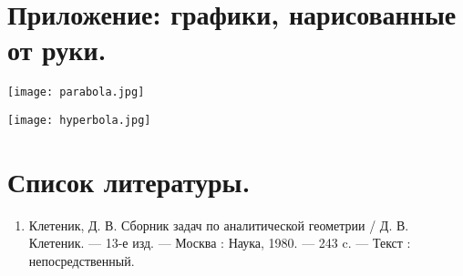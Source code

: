 \documentclass{article}
\theoremstyle{plain}
\begin{document}
\section{Приложение: графики, нарисованные от руки.}\label{pril}
\begin{center}
    \texttt{[image: parabola.jpg]}
    \end{center}

\begin{center}
    \texttt{[image: hyperbola.jpg]}
    \end{center}


\newpage
\section{Список литературы.}
\begin{enumerate}
    \item Клетеник, Д. В. Сборник задач по аналитической геометрии / Д. В. Клетеник. — 13-е изд. — Москва : Наука, 1980. — 243 c. — Текст : непосредственный.
\end{enumerate}
\end{document}
